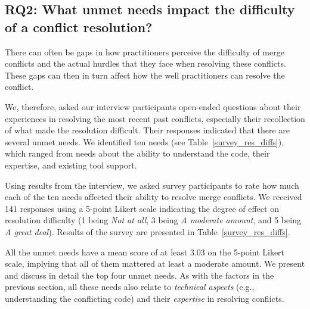 \subsection{\textbf{RQ2:} What unmet needs impact the difficulty of a conflict resolution?}\label{RQ2}

There can often be gaps in how practitioners perceive the difficulty of merge conflicts and the actual hurdles that they face when resolving these conflicts. 
These gaps can then in turn affect how the well practitioners can resolve the conflict.

We, therefore, asked our interview participants open-ended questions about their experiences in resolving the most recent past conflicts, especially their recollection of what made the resolution difficult.
Their responses indicated that there are several unmet needs. We identified ten needs (see Table~\ref{survey_res_diffs}), which ranged from needs about the ability to understand the code, their expertise, and existing tool support.  

Using results from the interview, we asked survey participants to rate how much each of the ten needs affected their ability to resolve merge conflicts.
We received 141 responses using a 5-point Likert scale indicating the degree of effect on resolution difficulty (1 being \textit{Not at all}, 3 being \textit{A moderate amount}, and 5 being \textit{A great deal}).
Results of the survey are presented in Table~\ref{survey_res_diffs}. 

All the unmet needs have a mean score of at least 3.03 on the 5-point Likert scale, implying that all of them mattered at least a moderate amount.
We present and discuss in detail the top four unmet needs. As with the factors in the previous section, all these needs also relate to \textit{technical aspects} (e.g., understanding the conflicting code) and their \textit{expertise} in resolving conflicts. 


